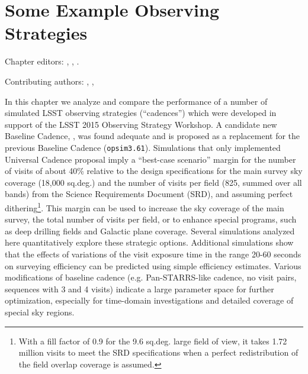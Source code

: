 
\chapter[Some Example Observing Strategies]{Some Example Observing Strategies}
\def\chpname{cadexp}\label{chp:\chpname}

Chapter editors:
,
,
.

Contributing authors:
,
,


 In this chapter
we analyze and compare the performance of a number of simulated LSST
observing strategies (``cadences'')
which were developed in support of the LSST 2015 Observing
Strategy Workshop.  A candidate new Baseline Cadence,
, was found adequate and is proposed as  a
replacement for the previous Baseline Cadence (\texttt{opsim3.61}).
Simulations that only implemented Universal Cadence proposal imply a
``best-case scenario'' margin for the number of visits of about 40\% relative to the design
specifications for the main survey sky coverage (18,000 sq.deg.) and the number of
visits per field (825, summed over all bands) from the Science Requirements Document (SRD),
and assuming perfect dithering\footnote{With a fill factor of 0.9 for the 9.6 sq.deg. large
field of view, it takes 1.72 million visits to meet the SRD specifications when a perfect
redistribution of the field overlap coverage is assumed.}.
This margin can be used to increase the sky coverage of the main survey, the total
number of visits per field, or to enhance special programs, such as
deep drilling fields and Galactic plane coverage. Several  simulations
analyzed here quantitatively explore these strategic options.
Additional simulations show that the effects of variations of the
visit exposure time in the  range 20-60 seconds on surveying
efficiency can be predicted using simple efficiency estimates. Various
modifications of baseline cadence (e.g. Pan-STARRS-like cadence,  no
visit pairs, sequences with 3 and 4 visits) indicate a large parameter
space for further optimization, especially for time-domain
investigations and detailed coverage of special sky regions.

